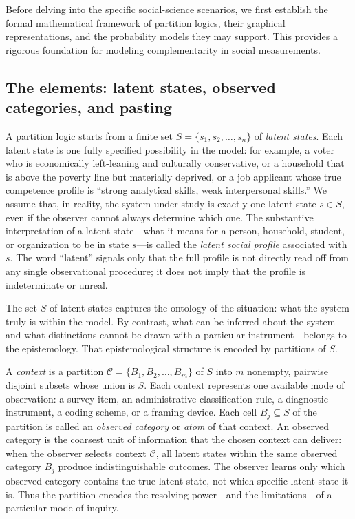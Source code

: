 \documentclass[aps,pra,twocolumn,superscriptaddress,floatfix,longbibliography]{revtex4-2}
\begin{document}
Before delving into the specific social-science scenarios, we first
establish the formal mathematical framework of partition logics,
their graphical representations, and the probability models they may
support. This provides a rigorous foundation for modeling
complementarity in social measurements.

\subsection{The elements: latent states, observed categories, and pasting}

A partition logic starts from a finite set
$S = \{s_1, s_2, \ldots, s_n\}$ of \emph{latent states}.
Each latent state is one fully specified possibility in the model:
for example, a voter who is economically left-leaning and culturally
conservative, or a household that is above the poverty line but
materially deprived, or a job applicant whose true competence profile
is ``strong analytical skills, weak interpersonal skills.'' We assume
that, in reality, the system under study is exactly one latent state
$s \in S$, even if the observer cannot always determine which one.
The substantive interpretation of a latent state---what it means for
a person, household, student, or organization to be in state $s$---is
called the \emph{latent social profile} associated with $s$. The word
``latent'' signals only that the full profile is not directly read
off from any single observational procedure; it does not imply that
the profile is indeterminate or unreal.

The set $S$ of latent states captures the ontology of the situation:
what the system truly is within the model. By contrast, what can be
inferred about the system---and what distinctions cannot be drawn
with a particular instrument---belongs to the epistemology. That
epistemological structure is encoded by partitions of $S$.

A \emph{context} is a partition
$\mathcal{C} = \{B_1, B_2, \ldots, B_m\}$ of $S$ into $m$
nonempty, pairwise disjoint subsets whose union is $S$. Each context
represents one available mode of observation: a survey item, an
administrative classification rule, a diagnostic instrument, a
coding scheme, or a framing device. Each cell $B_j \subseteq S$ of
the partition is called an \emph{observed category} or \emph{atom}
of that context. An observed category is the coarsest unit of
information that the chosen context can deliver: when the observer
selects context $\mathcal{C}$, all latent states within the same
observed category $B_j$ produce indistinguishable outcomes. The
observer learns only which observed category contains the true
latent state, not which specific latent state it is. Thus the
partition encodes the resolving power---and the limitations---of a
particular mode of inquiry.
\end{document}
